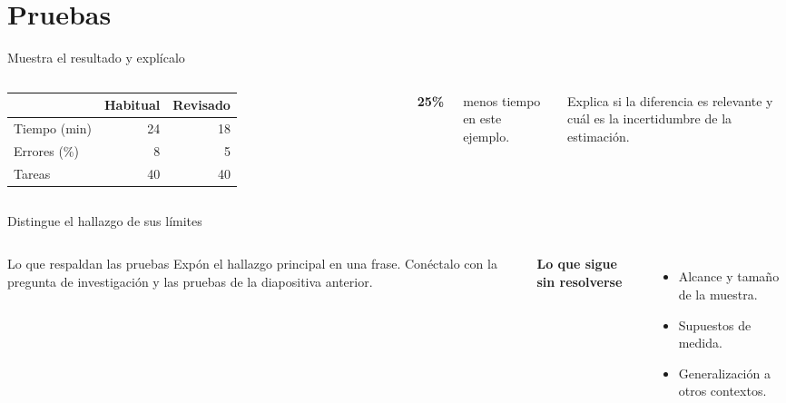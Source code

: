 \section{Pruebas}
\begin{frame}{Muestra el resultado y explícalo}
\begin{columns}[c,onlytextwidth]
\centering
\begin{tabular}{@{}lrr@{}}
\toprule
& Habitual & Revisado\\
\midrule
Tiempo (min) & 24 & 18\\
Errores (\%) & 8 & 5\\
Tareas & 40 & 40\\
\bottomrule
\end{tabular}
\par{}
{\Huge\bfseries\color{accent}25\%}\par\vspace{2mm}
menos tiempo en este ejemplo.\par\vspace{4mm}
Explica si la diferencia es relevante y cuál es la incertidumbre de la estimación.
\end{columns}
\end{frame}

\begin{frame}{Distingue el hallazgo de sus límites}
\begin{columns}[T,onlytextwidth]
\begin{block}{Lo que respaldan las pruebas}
Expón el hallazgo principal en una frase. Conéctalo con la pregunta de
investigación y las pruebas de la diapositiva anterior.
\end{block}
\textbf{Lo que sigue sin resolverse}\par\vspace{3mm}
\begin{itemize}\setlength{\itemsep}{3mm}
\item Alcance y tamaño de la muestra.
\item Supuestos de medida.
\item Generalización a otros contextos.
\end{itemize}
\end{columns}
\end{frame}
